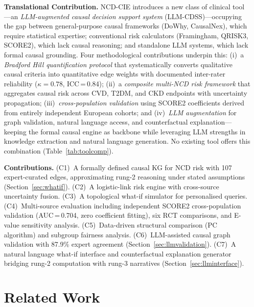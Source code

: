 \documentclass[runningheads]{llncs}
\begin{document}
\noindent\textbf{Translational Contribution.}
NCD-CIE introduces a new class of clinical tool---an \emph{LLM-augmented
causal decision support system} (LLM-CDSS)---occupying the gap between
general-purpose causal frameworks (DoWhy, CausalNex), which require
statistical expertise; conventional risk calculators (Framingham,
QRISK3, SCORE2), which lack causal reasoning; and standalone LLM
systems, which lack formal causal grounding.
Four methodological contributions underpin this:
(i)~a \emph{Bradford Hill quantification protocol} that
systematically converts qualitative causal criteria into quantitative
edge weights with documented inter-rater reliability ($\kappa=0.78$,
ICC\,=\,0.84);
(ii)~a \emph{composite multi-NCD risk framework} that aggregates
causal risk across CVD, T2DM, and CKD endpoints with uncertainty
propagation;
(iii)~\emph{cross-population validation} using SCORE2 coefficients
derived from entirely independent European cohorts; and
(iv)~\emph{LLM augmentation} for graph validation, natural language
access, and counterfactual explanation---keeping the formal causal
engine as backbone while leveraging LLM strengths in knowledge
extraction and natural language generation.
No existing tool offers this combination (Table~\ref{tab:toolcomp}).

\noindent\textbf{Contributions.}
(C1)~A formally defined causal KG for NCD risk with 107
expert-curated edges, approximating rung-2 reasoning under stated
assumptions (Section~\ref{sec:whatif}).
(C2)~A logistic-link risk engine with cross-source uncertainty fusion.
(C3)~A topological what-if simulator for personalised queries.
(C4)~Multi-source evaluation including independent SCORE2
cross-population validation (AUC\,=\,0.704, zero coefficient fitting),
six RCT comparisons, and E-value sensitivity analysis.
(C5)~Data-driven structural comparison (PC algorithm) and
subgroup fairness analysis.
(C6)~LLM-assisted causal graph validation with 87.9\% expert
agreement (Section~\ref{sec:llmvalidation}).
(C7)~A natural language what-if interface and counterfactual
explanation generator bridging rung-2 computation with rung-3
narratives (Section~\ref{sec:llminterface}).

\section{Related Work}\label{sec:related}
\end{document}
